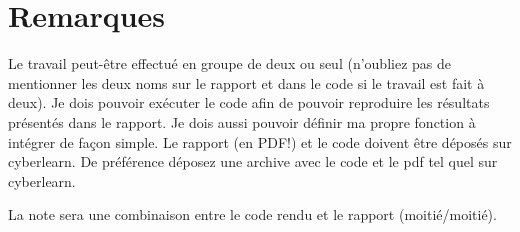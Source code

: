 \documentclass[a4paper,10pt]{article}
\begin{document}
\section*{Remarques}

Le travail peut-être effectué en groupe de deux ou seul
(n'oubliez pas de mentionner les deux noms sur le rapport et dans le code si le travail est fait à deux). 
Je dois pouvoir exécuter le code
afin de pouvoir reproduire les résultats présentés dans le rapport. Je dois aussi pouvoir 
définir ma propre fonction à intégrer de façon simple.
Le rapport (en PDF!) et le code doivent être déposés sur cyberlearn. De préférence déposez une archive avec le code et
le pdf tel quel sur cyberlearn.

La note sera une combinaison entre le code rendu et le rapport (moitié/moitié). 
\end{document}
